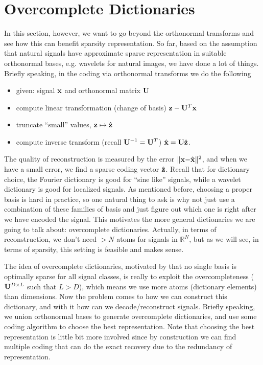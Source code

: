 \documentclass[../book-template.tex]{subfiles}
\begin{document}
\section{Overcomplete Dictionaries}
In this section, however, we want to go beyond the orthonormal transforms and see how this can benefit sparsity representation. So far, based on the assumption that natural signals have approximate sparse representation in suitable orthonormal bases, e.g. wavelets for natural images, we have done a lot of things. Briefly speaking, in the coding via orthonormal transforms we do the following
\begin{itemize}
	\item given: signal ${\bf x}$ and orthonormal matrix ${\bf U}$
	\item compute linear transformation (change of basis) ${\bf z}-{\bf U}^T{\bf x}$
	\item truncate ``small'' values, ${\bf z}\mapsto \hat{\bf z}$
	\item compute inverse transform (recall ${\bf U}^{-1}={\bf U}^T$) $\hat{\bf x}={\bf U}\hat{\bf z}$.
\end{itemize}
The quality of reconstruction is measured by the error $\|{\bf x-}\hat{\bf x}\|^2$, and when we have a small error, we find a sparse coding vector $\hat{\bf z}$. Recall that for dictionary choice, the Fourier dictionary is good for ``sine like'' signals, while a wavelet dictionary is good for localized signals. As mentioned before, choosing a proper basis is hard in practice, so one natural thing to ask is why not just use a combination of these families of basis and just figure out which one is right after we have encoded the signal. This motivates the more general dictionaries we are going to talk about: overcomplete dictionaries. Actually, in terms of reconstruction, we don't need $>N$ atoms for signals in $\mathbb{R}^N$, but as we will see, in terms of sparsity, this setting is feasible and makes sense.
\par The idea of overcomplete dictionaries, motivated by that no single basis is optimally sparse for all signal classes, is really to exploit the overcompleteness (${\bf U}^{D\times L}$ such that $L>D$), which means we use more atoms (dictionary elements) than dimensions. Now the problem comes to how we can construct this dictionary, and with it how can we decode/reconstruct signals. Briefly speaking, we union orthonormal bases to generate overcomplete dictionaries, and use some coding algorithm to choose the best representation. Note that choosing the best representation is little bit more involved since by construction we can find multiple coding that can do the exact recovery due to the redundancy of representation.
\end{document}
